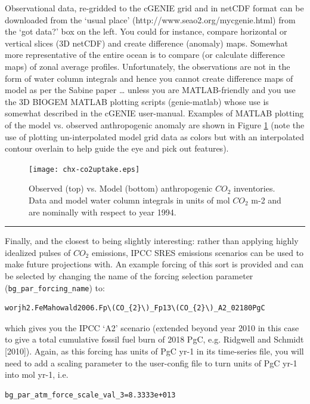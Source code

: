 \documentclass[11pt,fleqn]{book} %
\begin{document}
Observational data, re-gridded to the cGENIE grid and in netCDF format can be downloaded from the ‘usual place’ (http://www.seao2.org/mycgenie.html) from the ‘got data?’ box on the left. You could for instance, compare horizontal or vertical slices (3D netCDF) and create difference (anomaly) maps. Somewhat more representative of the entire ocean is to compare (or calculate difference maps) of zonal average profiles. Unfortunately, the observations are not in the form of water column integrals and hence you cannot create difference maps of model as per the Sabine paper … unless you are MATLAB-friendly and you use the 3D BIOGEM MATLAB plotting scripts (genie-matlab) whose use is somewhat described in the cGENIE user-manual. Examples of MATLAB plotting of the model vs. observed anthropogenic anomaly are shown in Figure \ref{fig:chx-co2uptake} (note the use of plotting un-interpolated model grid data as colors but with an interpolated contour overlain to help guide the eye and pick out features).

\begin{figure}[ht]
\begin{center}
\texttt{[image: chx-co2uptake.eps]}
\end{center}
\caption{Observed (top) vs. Model (bottom) anthropogenic \(CO_{2}\) inventories.
Data and model water column integrals in units of mol \(CO_{2}\) m-2 and are nominally with respect to year 1994.}
\label{fig:chx-co2uptake}
\end{figure}

\vspace{1mm}
\noindent\rule{4cm}{0.1mm}
\vspace{2mm}

\noindent Finally, and the closest to being slightly interesting: rather than applying highly idealized pulses  of \(CO_{2}\) emissions, IPCC SRES emissions scenarios can be used to make future projections with. An example forcing of this sort is provided and can be selected by changing the name of the forcing selection parameter (\texttt{bg\_par\_forcing\_name}) to:
\vspace{-2pt}\begin{verbatim}
worjh2.FeMahowald2006.Fp\(CO_{2}\)_Fp13\(CO_{2}\)_A2_02180PgC
\end{verbatim}\vspace{-2pt}
which gives you the IPCC ‘A2’ scenario (extended beyond year 2010 in this case to give a total cumulative fossil fuel burn of 2018 PgC, e.g. Ridgwell and Schmidt [2010]).
Again, as this forcing has units of PgC yr-1 in its time-series file, you will need to add a scaling parameter to the user-config file to turn units of PgC yr-1 into mol yr-1, i.e.
\vspace{-2pt}\begin{verbatim}
bg_par_atm_force_scale_val_3=8.3333e+013
\end{verbatim}\vspace{-2pt}
\end{document}
